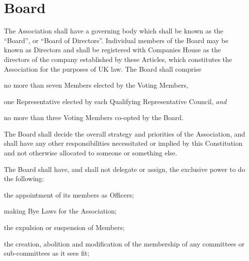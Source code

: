 \documentclass[12pt]{article}
\newcommand{\EC}[0]{Board}
\newcommand{\Exec}[0]{\EC{} }
\newcommand{\ITand}[0]{\textit{and}}
\begin{document}

\section{\Exec}
  \begin{constenum}

  \item The Association shall have a governing body which shall be
    known as the ``\EC{}'', or ``Board of Directors''. Individual
    members of the \Exec may be known as Directors and shall be
    registered with Companies House as the directors of the company
    established by these Articles, which constitutes the Association
    for the purposes of UK law. The \Exec shall comprise
    \begin{constenum}
      \item no more than seven Members elected by the Voting
        Members, \label{ordinaryboard}
      \item one Representative elected by each Qualifying
        Representative Council, \ITand \label{boardreps}
      \item no more than three Voting Members co-opted by the
        \EC{}. \label{cooptedboard}
    \end{constenum}

  \item The \Exec shall decide the overall strategy and priorities of
    the Association, and shall have any other responsibilities
    necessitated or implied by this Constitution and not otherwise
    allocated to someone or something else.

  \item The \Exec shall have, and
    shall not delegate or assign, the exclusive power to do the
    following:\label{nondelegation}

    \begin{constenum}
      \item the appointment of its members as Officers;

      \item making Bye Laws for the Association;

      \item the expulsion or suspension of Members;

      \item the creation, abolition and modification of the membership of
        any committees or sub-committees as it sees fit;


\end{constenum}
\end{constenum}
\end{document}
